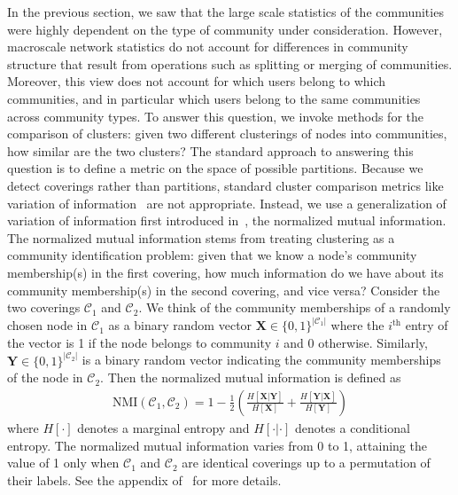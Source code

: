 In the previous section, we saw that the large scale statistics of the communities were highly dependent on the type of community under consideration. However, macroscale network statistics do not account for differences in community structure that result from operations such as splitting or merging of communities. Moreover, this view does not account for which users belong to which communities, and in particular which users belong to the same communities across community types. To answer this question, we invoke methods for the comparison of clusters: given two different clusterings of nodes into communities, how similar are the two clusters? The standard approach to answering this question is to define a metric on the space of possible partitions.  
Because we detect coverings rather than partitions, standard cluster comparison metrics like variation of information~\cite{meilua2003comparing} are not appropriate. Instead, we use a generalization of variation of information first introduced in~\cite{Lancichinetti2009}, the normalized mutual information. The normalized mutual information stems from treating clustering as a community identification problem: given that we know a node's community membership(s) in the first covering, how much information do we have about its community membership(s) in the second covering, and vice versa? Consider the two coverings $\mathcal{C}_{1}$ and $\mathcal{C}_{2}.$ We think of the community memberships of a randomly chosen node in $\mathcal{C}_{1}$ as a binary random vector $\mathbf{X} \in \{0, 1\}^{|\mathcal{C}_{1}|}$ where the $i^{\text{th}}$ entry of the vector is 1 if the node belongs to community $i$ and 0 otherwise. Similarly, $\mathbf{Y} \in \{ 0, 1\}^{|\mathcal{C}_{2}|}$ is a binary random vector indicating the community memberships of the node in $\mathcal{C}_{2}$. Then the normalized mutual information is defined as
\begin{align}
	\text{NMI}(\mathcal{C}_{1}, \mathcal{C}_{2}) = 1 - \frac{1}{2} \left( \frac{H[\mathbf{X} | \mathbf{Y}]}{H[\mathbf{X}]} + \frac{H[\mathbf{Y} | \mathbf{X}]}{H[\mathbf{Y}]}\right)
\end{align}
where $H[\cdot]$ denotes a marginal entropy and $H[\cdot | \cdot]$ denotes a conditional entropy. The normalized mutual information varies from 0 to 1, attaining the value of 1 only when $\mathcal{C}_{1}$ and $\mathcal{C}_{2}$ are identical coverings up to a permutation of their labels. See the appendix of~\cite{Lancichinetti2009} for more details.


